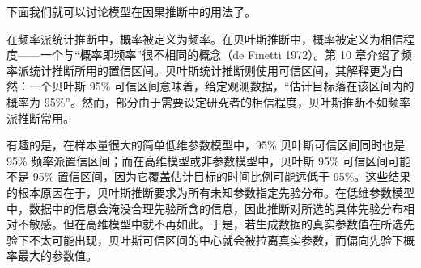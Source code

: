 下面我们就可以讨论模型在因果推断中的用法了。

\begin{finepoint}
在频率派统计推断中，概率被定义为频率。在贝叶斯推断中，概率被定义为相信程度——一个与“概率即频率”很不相同的概念（de Finetti 1972）。第 10 章介绍了频率派统计推断所用的置信区间。贝叶斯统计推断则使用可信区间，其解释更为自然：一个贝叶斯 95\% 可信区间意味着，给定观测数据，“估计目标落在该区间内的概率为 95\%”。然而，部分由于需要设定研究者的相信程度，贝叶斯推断不如频率派推断常用。

有趣的是，在样本量很大的简单低维参数模型中，95\% 贝叶斯可信区间同时也是 95\% 频率派置信区间；而在高维模型或非参数模型中，贝叶斯 95\% 可信区间可能不是 95\% 置信区间，因为它覆盖估计目标的时间比例可能远低于 95\%。这些结果的根本原因在于，贝叶斯推断要求为所有未知参数指定先验分布。在低维参数模型中，数据中的信息会淹没合理先验所含的信息，因此推断对所选的具体先验分布相对不敏感。但在高维模型中就不再如此。于是，若生成数据的真实参数值在所选先验下不太可能出现，贝叶斯可信区间的中心就会被拉离真实参数，而偏向先验下概率最大的参数值。
\end{finepoint}

